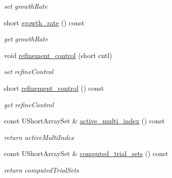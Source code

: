 \begin{DoxyCompactItemize}
\begin{DoxyCompactList}\small\item\em set growth\+Rate \end{DoxyCompactList}\item 
short \hyperlink{classPecos_1_1SparseGridDriver_aa6cd922718848b70dcdf85b602b3b673}{growth\+\_\+rate} () const \label{classPecos_1_1SparseGridDriver_aa6cd922718848b70dcdf85b602b3b673}

\begin{DoxyCompactList}\small\item\em get growth\+Rate \end{DoxyCompactList}\item 
void \hyperlink{classPecos_1_1SparseGridDriver_aaf441f2568a9c15e99b05e6da885e3d8}{refinement\+\_\+control} (short cntl)\label{classPecos_1_1SparseGridDriver_aaf441f2568a9c15e99b05e6da885e3d8}

\begin{DoxyCompactList}\small\item\em set refine\+Control \end{DoxyCompactList}\item 
short \hyperlink{classPecos_1_1SparseGridDriver_ae00e3431ee5625691f3736b0aea6c644}{refinement\+\_\+control} () const \label{classPecos_1_1SparseGridDriver_ae00e3431ee5625691f3736b0aea6c644}

\begin{DoxyCompactList}\small\item\em get refine\+Control \end{DoxyCompactList}\item 
const U\+Short\+Array\+Set \& \hyperlink{classPecos_1_1SparseGridDriver_a1c384f92f4ac288f352768f95490c2ed}{active\+\_\+multi\+\_\+index} () const \label{classPecos_1_1SparseGridDriver_a1c384f92f4ac288f352768f95490c2ed}

\begin{DoxyCompactList}\small\item\em return active\+Multi\+Index \end{DoxyCompactList}\item 
const U\+Short\+Array\+Set \& \hyperlink{classPecos_1_1SparseGridDriver_aa311c5d1fc4618dc3588269409226d96}{computed\+\_\+trial\+\_\+sets} () const \label{classPecos_1_1SparseGridDriver_aa311c5d1fc4618dc3588269409226d96}

\begin{DoxyCompactList}\small\item\em return computed\+Trial\+Sets \end{DoxyCompactList}\end{DoxyCompactItemize}
